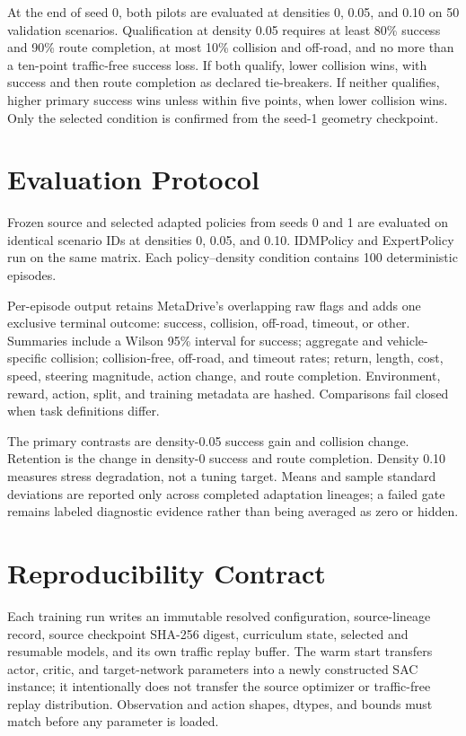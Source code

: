 \documentclass[10pt,twocolumn]{article}
\begin{document}
At the end of seed 0, both pilots are evaluated at densities 0, 0.05, and 0.10 on 50
validation scenarios. Qualification at density 0.05 requires at least 80\% success and
90\% route completion, at most 10\% collision and off-road, and no more than a ten-point
traffic-free success loss. If both qualify, lower collision wins, with success and then
route completion as declared tie-breakers. If neither qualifies, higher primary success
wins unless within five points, when lower collision wins. Only the selected condition is
confirmed from the seed-1 geometry checkpoint.

\section{Evaluation Protocol}
Frozen source and selected adapted policies from seeds 0 and 1 are evaluated on identical
scenario IDs at densities 0, 0.05, and 0.10. IDMPolicy and ExpertPolicy run on the same
matrix. Each policy--density condition contains 100 deterministic episodes.

Per-episode output retains MetaDrive's overlapping raw flags and adds one exclusive
terminal outcome: success, collision, off-road, timeout, or other. Summaries include a
Wilson 95\% interval for success; aggregate and vehicle-specific collision; collision-free,
off-road, and timeout rates; return, length, cost, speed, steering magnitude, action
change, and route completion. Environment, reward, action, split, and training metadata
are hashed. Comparisons fail closed when task definitions differ.

The primary contrasts are density-0.05 success gain and collision change. Retention is the
change in density-0 success and route completion. Density 0.10 measures stress degradation,
not a tuning target. Means and sample standard deviations are reported only across
completed adaptation lineages; a failed gate remains labeled diagnostic evidence rather
than being averaged as zero or hidden.

\section{Reproducibility Contract}
Each training run writes an immutable resolved configuration, source-lineage record,
source checkpoint SHA-256 digest, curriculum state, selected and resumable models, and
its own traffic replay buffer. The warm start transfers actor, critic, and target-network
parameters into a newly constructed SAC instance; it intentionally does not transfer the
source optimizer or traffic-free replay distribution. Observation and action shapes,
dtypes, and bounds must match before any parameter is loaded.
\end{document}
